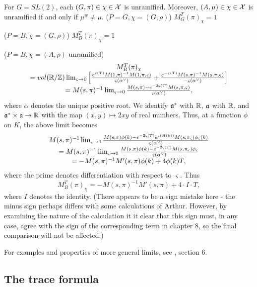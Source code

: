 \begin{example} For $G=SL(2)$, each $(G,\pi)\in\chi\in{\cal{X}}$ is
unramified. Moreover, $(A,\mu)\in\chi\in{\cal{X}}$ is unramified
if and only if $\mu^w\not=\mu$.
($P=G,\chi =(G,\rho )$) $M_G^T(\pi )_\chi =1$

($P=B,\chi =(G,\rho )$) $M_B^T(\pi )_\chi =1$

($P=B,\chi =(A,\rho )$ unramified) 
\[
\begin{array}{c}
M_B^T(\pi )_\chi \\
=vol({\Bbb{R}}/{\Bbb{Z}})
\lim_{\varsigma \rightarrow 0}
\left[
\frac{e^{\varsigma (T)}
M(1,\pi )^{-1}M(1,\pi ,\varsigma )}{\varsigma (\alpha^{\vee })}
+\frac{e^{-\varsigma (T)}
M(s,\pi )^{-1}M(s,\pi ,\varsigma )}{-\varsigma (\alpha^{\vee })}
\right]\\
=M(s,\pi)^{-1}
\lim_{\varsigma \rightarrow 0}
{M(s,\pi)-e^{-2\varsigma (T)}M(s,\pi,\varsigma)
\over \varsigma(\alpha^\vee)} ,
\end{array}
\]
where $\alpha $ denotes the unique positive root.
We identify ${\frak{a}}^*$ with ${\Bbb{R}}$, ${\frak{a}}$ with
${\Bbb{R}}$, and
${\frak{a}}^*\times {\frak{a}}\rightarrow {\Bbb{R}}$ with
the map $(x,y)\longmapsto 2xy$
of real numbers. Thus, at a function $\phi$
on $K$, the above limit becomes 
\[
\begin{array}{c}
M(s,\pi)^{-1}
\lim_{\varsigma \rightarrow 0}
{M(s,\pi)\phi(k)-e^{-2\varsigma (T)}e^{\varsigma (H(k))}
M(s,\pi_\varsigma)\phi_\varsigma(k)
\over \varsigma(\alpha^\vee)} \\
=M(s,\pi)^{-1}
\lim_{\varsigma \rightarrow 0}
{M(s,\pi)\phi(k)-e^{-2\varsigma (T)}M(s,\pi_\varsigma)\phi_\varsigma
\over \varsigma(\alpha^\vee)} \\
=-M(s,\pi)^{-1}M'(s,\pi)\phi(k)+4 \phi(k) T,
\end{array}
\]
where the prime denotes differentiation with respect to
$\varsigma$. Thus
\[
M_B^T(\pi )_\chi =
-M(s,\pi)^{-1}M'(s,\pi)+4\cdot I\cdot T,
\]
where $I$ denotes the identity. (There appears to be a sign
mistake here - the minus sign perhaps differs with some
calculations of Arthur. However, by examining the nature of the
calculation it it clear that this sign must,
in any case, agree with the sign of the corresponding term in
chapter 8, so the
final comparison will not be affected.)

For
examples and properties of more general limits, see
\cite{A6}, section 6.
\end{example}


\subsection{The trace formula}

